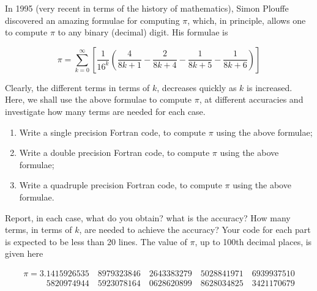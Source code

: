 \begin{homework}[label={H:1-2}]
    In 1995 (very recent in terms of the history of mathematics), Simon Plouffe discovered an amazing formulae for computing $\pi$, which, in principle, allows one to compute $\pi$ to any binary (decimal) digit. His formulae is

    \[
        \pi = \sum_{k=0}^{\infty} \left[
            \frac{1}{16^k} \left(
                \frac{4}{8k+1} - \frac{2}{8k+4} - \frac{1}{8k+5} - \frac{1}{8k+6}
            \right)
        \right]
    \]

    Clearly, the different terms in terms of $k$, decreases quickly as $k$ is increased. Here, we shall use the above formulae to compute $\pi$, at different accuracies and investigate how many terms are needed for each case.

    \begin{enumerate}[label=(\alph*)]
        \item Write a single precision Fortran code, to compute $\pi$ using the above formulae;
        \item Write a double precision Fortran code, to compute $\pi$ using the above formulae;
        \item Write a quadruple precision Fortran code, to compute $\pi$ using the above formulae.
    \end{enumerate}

    Report, in each case, what do you obtain? what is the accuracy? How many terms, in terms of $k$, are needed to achieve the accuracy? Your code for each part is expected to be less than 20 lines. The value of $\pi$, up to 100th decimal places, is given here

    \begin{align*}
        \pi =              3.1415926535 \quad 8979323846 \quad 2643383279 \quad 5028841971 \quad 6939937510 \\
            \phantom{\pi=3.} 5820974944 \quad 5923078164 \quad 0628620899 \quad 8628034825 \quad 3421170679
    \end{align*}
\end{homework}

